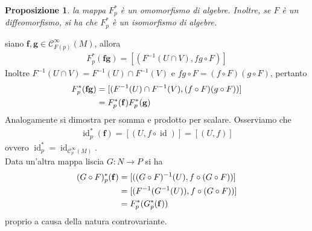\documentclass[oneside, 11pt]{amsbook}
\makeatletter
\newcommand{\C}{\mathcal{C}}
\newcommand{\f}{\mathbf{f}}
\newcommand{\g}{\mathbf{g}}
\newcommand{\id}{\operatorname{id}}
\newcommand{\0}{{(0)}}
\newcommand{\3}{{(3)}}
\theoremstyle{colonplain}
\newtheorem{prop}[thm]{Proposizione}
\theoremstyle{colondefinition}
\theoremstyle{colonremark}
\numberwithin{equation}{chapter}
\renewcommand{\proofname}{Dimostrazione}
\renewenvironment{proof}[1][\proofname]{\par
  \pushQED{\qed}%
  \normalfont \topsep6\p@\@plus6\p@\relax
  \trivlist
  \item[\hskip\labelsep\bfseries #1:]\ignorespaces
}{%
  \popQED\endtrivlist\@endpefalse
}
\makeatother
\begin{document}
\begin{prop}
    la mappa $F^*_p$ è un omomorfismo di algebre. Inoltre, se $F$ è un diffeomorfismo, si ha che $F^*_p$ è un isomorfismo di algebre.
\end{prop}
\begin{proof}
    siano $\f, \g \in \C^\infty_{F(p)}(M)$, allora
    \begin{align}
        F^*_p(\f\g) = [(F^{-1}(U \cap V), fg \circ F)]
    \end{align}
    Inoltre $F^{-1}(U \cap V) = F^{-1}(U) \cap F^{-1}(V)$ e $fg \circ F = (f \circ F)(g \circ F)$, pertanto
    \begin{align}
        F^*_p(\f\g) &= [(F^{-1}(U) \cap F^{-1}(V), (f \circ F)(g \circ F))] \notag \\
        &= F^*_p(\f)F^*_p(\g)
    \end{align}
    Analogamente si dimostra per somma e prodotto per scalare. Osserviamo che
    \begin{align}
        \id^*_p(\f) = [(U, f \circ \id)] = [(U, f)]
    \end{align}
    ovvero $\id^*_p = \id_{\C^\infty_p(M)}$. \\
    Data un'altra mappa liscia $G : N \longrightarrow P$ si ha
    \begin{align}
        (G \circ F)^*_p(\f) &= [((G \circ F)^{-1}(U), f \circ (G \circ F))] \notag \\
        &= [(F^{-1}(G^{-1}(U)), f \circ (G \circ F))] \notag \\
        &= F^*_p(G^*_p(\f))
    \end{align}
    proprio a causa della natura controvariante.
\end{proof}
\end{document}
